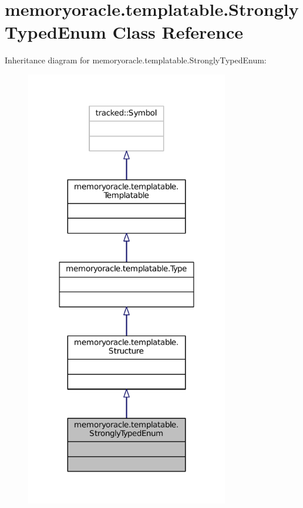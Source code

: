 \hypertarget{classmemoryoracle_1_1templatable_1_1StronglyTypedEnum}{}\section{memoryoracle.\+templatable.\+Strongly\+Typed\+Enum Class Reference}
\label{classmemoryoracle_1_1templatable_1_1StronglyTypedEnum}


Inheritance diagram for memoryoracle.\+templatable.\+Strongly\+Typed\+Enum\+:\nopagebreak
\begin{figure}[H]
\begin{center}
\leavevmode
\includegraphics[width=251pt]{classmemoryoracle_1_1templatable_1_1StronglyTypedEnum__inherit__graph}
\end{center}
\end{figure}


